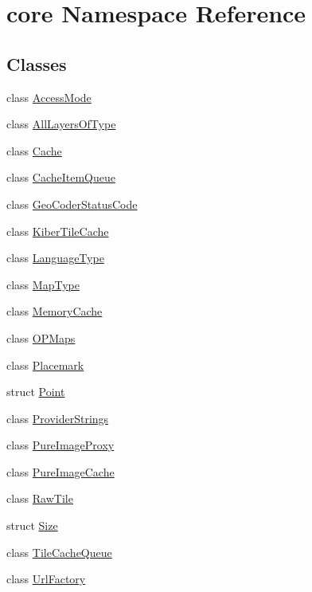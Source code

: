 \hypertarget{namespacecore}{\section{core Namespace Reference}
\label{namespacecore}
}
\subsection*{Classes}
\begin{DoxyCompactItemize}
\item 
class \hyperlink{classcore_1_1_access_mode}{Access\-Mode}
\item 
class \hyperlink{classcore_1_1_all_layers_of_type}{All\-Layers\-Of\-Type}
\item 
class \hyperlink{classcore_1_1_cache}{Cache}
\item 
class \hyperlink{classcore_1_1_cache_item_queue}{Cache\-Item\-Queue}
\item 
class \hyperlink{classcore_1_1_geo_coder_status_code}{Geo\-Coder\-Status\-Code}
\item 
class \hyperlink{classcore_1_1_kiber_tile_cache}{Kiber\-Tile\-Cache}
\item 
class \hyperlink{classcore_1_1_language_type}{Language\-Type}
\item 
class \hyperlink{classcore_1_1_map_type}{Map\-Type}
\item 
class \hyperlink{classcore_1_1_memory_cache}{Memory\-Cache}
\item 
class \hyperlink{classcore_1_1_o_p_maps}{O\-P\-Maps}
\item 
class \hyperlink{classcore_1_1_placemark}{Placemark}
\item 
struct \hyperlink{structcore_1_1_point}{Point}
\item 
class \hyperlink{classcore_1_1_provider_strings}{Provider\-Strings}
\item 
class \hyperlink{classcore_1_1_pure_image_proxy}{Pure\-Image\-Proxy}
\item 
class \hyperlink{classcore_1_1_pure_image_cache}{Pure\-Image\-Cache}
\item 
class \hyperlink{classcore_1_1_raw_tile}{Raw\-Tile}
\item 
struct \hyperlink{structcore_1_1_size}{Size}
\item 
class \hyperlink{classcore_1_1_tile_cache_queue}{Tile\-Cache\-Queue}
\item 
class \hyperlink{classcore_1_1_url_factory}{Url\-Factory}
\end{DoxyCompactItemize}
